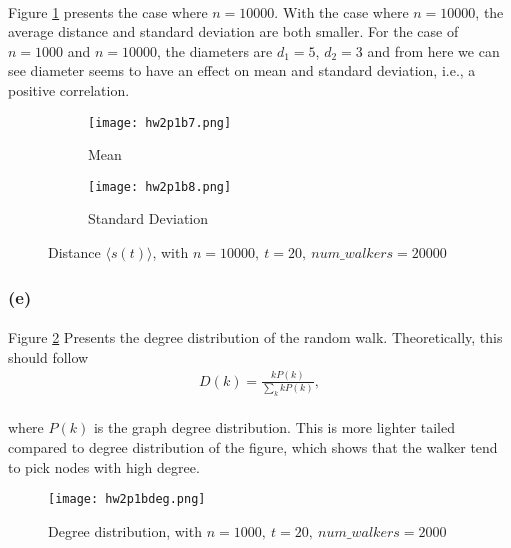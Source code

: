 \paragraph{}
Figure \ref{fig:a5} presents the case where $n = 10000$. With the case where $n = 10000$, the average distance and standard deviation are both smaller. For the case of $n = 1000$ and $n = 10000$, the diameters are $d_1 = 5$, $d_2 = 3$ and from here we can see diameter seems to have an effect on mean and standard deviation, i.e., a positive correlation.
\begin{figure}[h]
	\centering
	\begin{subfigure}{.5\textwidth}
		\centering
		\texttt{[image: hw2p1b7.png]}
		\caption{Mean}
	\end{subfigure}%
	\begin{subfigure}{.5\textwidth}
		\centering
		\texttt{[image: hw2p1b8.png]}
		\caption{Standard Deviation}
	\end{subfigure}
	\caption{Distance $\langle s(t)\rangle$, with $n = 10000,\ t = 20,\ num\_walkers = 20000$}
	\label{fig:a5}
\end{figure}
\subsubsection*{(e)}
\paragraph{}
Figure \ref{fig:a6} Presents the degree distribution of the random walk. Theoretically, this should follow
\begin{align*}
D(k) = \frac{kP(k)}{\sum_k kP(k)},
\end{align*}
\paragraph{}
where $P(k)$ is the graph degree distribution. This is more lighter tailed compared to degree distribution of the figure, which shows that the walker tend to pick nodes with high degree.

\begin{figure} [h!]
	\centering
	\texttt{[image: hw2p1bdeg.png]}
	\caption{Degree distribution, with $n = 1000,\ t = 20,\ num\_walkers = 2000$}
	\label{fig:a6}
\end{figure}